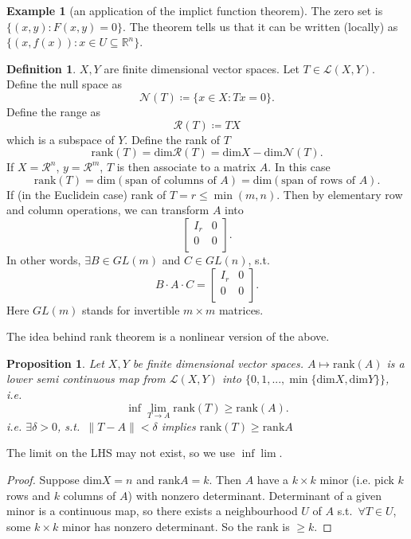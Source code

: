 \documentclass[12pt]{article}
\theoremstyle{plain}
\newtheorem*{prop}{Proposition}
\theoremstyle{definition}
\newtheorem*{defn}{Definition}
\newtheorem*{eg}{Example}
\begin{document}
\begin{eg}[an application of the implict function theorem]
    The zero set is $\{(x,y):F(x,y) = 0\}$.
    The theorem tells us that it can be written (locally) as $\{(x,f(x)):x\in U\subseteq \mathbb{R}^n\}$.
\end{eg}

\begin{defn}
    $X, Y$ are finite dimensional vector spaces.
    Let $T\in\mathcal{L}(X,Y)$.
    Define the null space as
    \[
        \mathcal{N}(T)\coloneqq\{x\in X:Tx=0\}.
    \]
    Define the range as
    \[
        \mathcal{R}(T)\coloneqq TX
    \]
    which is a subspace of $Y$.
    Define the rank of $T$
    \[
        \text{rank}(T) = \text{dim} \mathcal{R}(T) = \text{dim} X - \text{dim}\mathcal{N}(T).
    \]
    If $X=\mathcal{R}^n$, $y=\mathcal{R}^m$, $T$ is then associate to a matrix $A$.
    In this case
    \[
        \text{rank}(T) = \text{dim}(\text{span of columns of }A) = \text{dim}(\text{span of rows of }A).
    \]
    If (in the Euclidein case) rank of $T = r\leq \min(m,n)$.
    Then by elementary row and column operations, we can transform $A$ into
    \[
        \begin{bmatrix}
            I_r & 0\\
            0 & 0\\
        \end{bmatrix}.
    \]
    In other words, $\exists B\in GL(m)$ and $C\in GL(n)$, s.t.
    \[
        B\cdot A\cdot C=
        \begin{bmatrix}
            I_r & 0\\
            0   & 0\\
        \end{bmatrix}.
    \]
    Here $GL(m)$ stands for invertible $m\times m$ matrices.
\end{defn}
The idea behind rank theorem is a nonlinear version of the above.

\begin{prop}
    Let $X,Y$ be finite dimensional vector spaces.
    $A\mapsto \text{rank}(A)$ is a lower semi continuous map from $\mathcal{L}(X,Y)$ into $\{0,1,...,\min\{\text{dim}X,\text{dim}Y\}\}$,
    i.e.
    \[
        \inf \lim_{T\rightarrow A} \text{rank}(T)\geq \text{rank}(A).
    \]
    i.e. $\exists \delta > 0$, s.t.\ $\|T-A\|<\delta$ implies $\text{rank}(T)\geq \text{rank}A$
\end{prop}
    The limit on the LHS may not exist, so we use $\inf\lim$.
\begin{proof}
    Suppose $\text{dim}X=n$ and $\text{rank}A=k$.
    Then $A$ have a $k\times k$ minor (i.e. pick $k$ rows and $k$ columns of $A$) with nonzero determinant.
    Determinant of a given minor is a continuous map, so there exists a neighbourhood $U$ of $A$ s.t.\ $\forall T\in U$, some $k\times k$ minor has
    nonzero determinant.
    So the rank is $\geq k$.
\end{proof}
\end{document}
